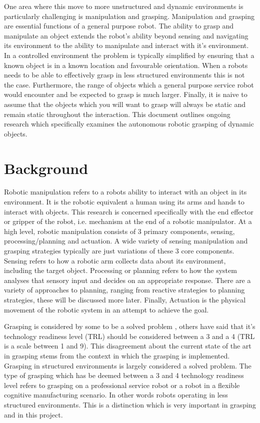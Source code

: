 One area where this move to more unstructured and dynamic environments is particularly challenging is manipulation and grasping. Manipulation and grasping are essential functions of a general purpose robot. The ability to grasp and manipulate an object extends the robot's ability beyond sensing and navigating its environment to the ability to manipulate and interact with it's environment. In a controlled environment the problem is typically simplified by ensuring that a known object is in a known location and favourable orientation. When a robots needs to be able to effectively grasp in less structured environments this is not the case. Furthermore, the range of objects which a general purpose service robot would encounter and be expected to grasp is much larger. Finally, it is naive to assume that the objects which you will want to grasp will always be static and remain static throughout the interaction. This document outlines ongoing research which specifically examines the autonomous robotic grasping of dynamic objects.

\section{Background}

Robotic manipulation refers to a robots ability to interact with an object in its environment. It is the robotic equivalent a human using its arms and hands to interact with objects. This research is concerned  specifically with the end effector or gripper of the robot, i.e. mechanism at the end of a robotic manipulator. At a high level, robotic manipulation consists of 3 primary components, sensing, processing/planning and actuation. A wide variety of sensing manipulation and grasping strategies typically are just variations of these 3 core components. Sensing refers to how a robotic arm collects data about its environment, including the target object. Processing or planning refers to how the system analyses that sensory input and decides on an appropriate response. There are a variety of approaches to planning, ranging from reactive strategies to planning strategies, these will be discussed more later. Finally, Actuation is the physical movement of the robotic system in an attempt to achieve the goal.

Grasping is considered by some to be a solved problem \cite{APCObservations}, others have said that it's technology readiness level (TRL) should be considered between a 3 and a 4 \cite{KukayouBot} (TRL is a scale between 1 and 9). This disagreement about the current state of the art in grasping stems from the context in which the grasping is implemented. Grasping in structured environments is largely considered a solved problem. The type of grasping which has be deemed between a 3 and 4 technology readiness level refers to grasping on a professional service robot or a robot in a flexible cognitive manufacturing scenario. In other words robots operating in less structured environments. This is a distinction which is very important in grasping and in this project.


